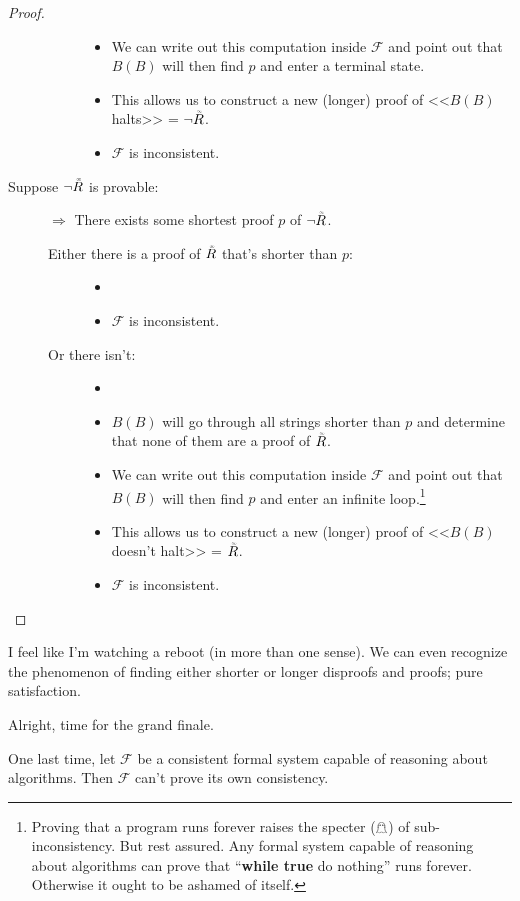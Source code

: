 \documentclass{article}
\theoremstyle{customstyle}
\newcommand{\F}{\ensuremath{\mathcal{F}}}
\newcommand{\iRosser}{\ensuremath{\accentset{\scalebox{0.35}{$\infty$}}{R}}}
\begin{document}
\begin{proof}
\begin{description}
\begin{description}
\begin{itemize}
\item We can write out this computation inside $\F$ and point out that $B(B)$ will then find $p$ and enter a terminal state.
\item This allows us to construct a new (longer) proof of <<$B(B)$ halts>> = $\neg \iRosser$.
\item $\F$ is inconsistent. \lightning
\end{itemize}
\end{description}
\item[Suppose $\neg \iRosser$ is provable:]
$\Rightarrow$ There exists some shortest proof $p$ of $\neg \iRosser$.
\begin{description}
\item[Either there is a proof of $\iRosser$ that's shorter than $p$:]
\begin{itemize}
\item[]
\item $\F$ is inconsistent. \lightning
\end{itemize}
\item[Or there isn't:]
\begin{itemize}
\item[]
\item $B(B)$ will go through all strings shorter than $p$ and determine that none of them are a proof of $\iRosser$.
\item We can write out this computation inside $\F$ and point out that $B(B)$ will then find $p$ and enter an infinite loop.\footnote{Proving that a program runs forever raises the specter ($\mathghost$) of sub-inconsistency. But rest assured. Any formal system capable of reasoning about algorithms can prove that ``\textbf{while true} do nothing'' runs forever. Otherwise it ought to be ashamed of itself.}
\item This allows us to construct a new (longer) proof of <<$B(B)$ doesn't halt>> = $\iRosser$.
\item $\F$ is inconsistent. \lightning
\end{itemize}
\end{description}
\end{description}
\end{proof}

I feel like I'm watching a reboot (in more than one sense). We can even recognize the phenomenon of finding either shorter or longer disproofs and proofs; pure satisfaction.

Alright, time for the grand finale.

\begin{theorem}
One last time, let $\F$ be a consistent formal system capable of reasoning about algorithms. Then $\F$ can't prove its own consistency.
\end{theorem}
\end{document}
